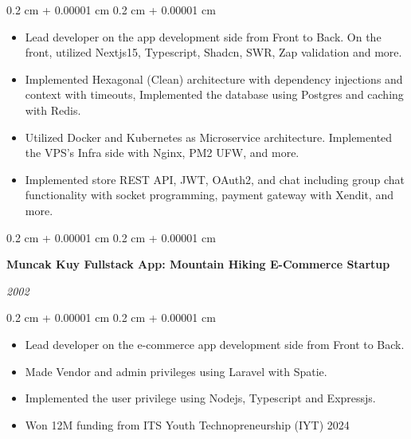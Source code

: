 \documentclass[10pt, letterpaper]{article}
\newenvironment{highlights}{
    \begin{itemize}[
        topsep=0.10 cm,
        parsep=0.10 cm,
        partopsep=0pt,
        itemsep=0pt,
        leftmargin=0.4 cm + 10pt
    ]
}{
    \end{itemize}
} %
\newenvironment{onecolentry}{
    \begin{adjustwidth}{
        0.2 cm + 0.00001 cm
    }{
        0.2 cm + 0.00001 cm
    }
}{
    \end{adjustwidth}
} %
\newenvironment{twocolentry}[2][]{
    \onecolentry
    \def\secondColumn{#2}
    \setcolumnwidth{\fill, 4.5 cm}
    \begin{paracol}{2}
}{
    \switchcolumn \raggedleft \secondColumn
    \end{paracol}
    \endonecolentry
} %
\begin{document}
        \vspace{0.10 cm}
        \begin{onecolentry}
            \begin{highlights}
                \item Lead developer on the app development side from Front to Back. On the front, utilized Nextjs15, Typescript, Shadcn, SWR, Zap validation and more.
                \item Implemented Hexagonal (Clean) architecture with dependency injections and context with timeouts, Implemented the database using Postgres and caching with Redis.
                \item Utilized Docker and Kubernetes as Microservice architecture. Implemented the VPS's Infra side with Nginx, PM2 UFW, and more.
                \item Implemented store REST API, JWT, OAuth2, and chat including group chat functionality with socket programming, payment gateway with Xendit, and more.
            \end{highlights}
        \end{onecolentry}

        \vspace{0.2 cm}

        \begin{twocolentry}{

        \textit{2002}}
            \textbf{Muncak Kuy Fullstack App: Mountain Hiking E-Commerce Startup}
        \end{twocolentry}

        \vspace{0.10 cm}
        \begin{onecolentry}
            \begin{highlights}
                \item Lead developer on the e-commerce app development side from Front to Back.
                \item Made Vendor and admin privileges using Laravel with Spatie.
                \item Implemented the user privilege using Nodejs, Typescript and Expressjs.
                \item Won 12M funding from ITS Youth Technopreneurship (IYT) 2024
            \end{highlights}
        \end{onecolentry}

        \vspace{0.2 cm}
\end{document}
